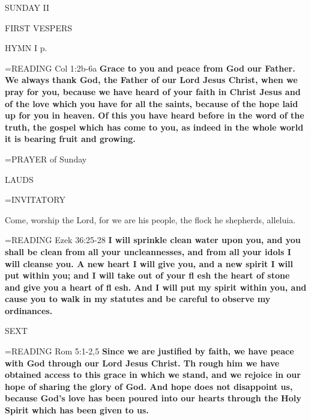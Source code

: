 \begin{center}\normalsize SUNDAY II\\
\end{center}

\begin{flushleft}\normalsize FIRST VESPERS\\\end{flushleft}

HYMN I p. \pageref{ordinaryTime:firstHymn}

\hangindent=\parindent \small{READING} Col 1:2b-6a \textbf{Grace to you and peace from God our Father.  We always thank God, the Father of our Lord Jesus Christ, when we pray for you, because we have heard of your faith in Christ Jesus and of the love which you have for all the saints, because of the hope laid up for you in heaven. Of this you have heard before in the word of the truth, the gospel which has come to you, as indeed in the whole world it is bearing fruit and growing.  \\}

\hangindent=\parindent \small{PRAYER  of Sunday}

\begin{flushleft}\normalsize LAUDS\\\end{flushleft}

\hangindent=\parindent \small{INVITATORY}
\begin{center}
\end{center}

Come, worship the Lord, for we are his people, the flock he shepherds, alleluia.

\hangindent=\parindent \small{READING} Ezek 36:25-28 \textbf{I will sprinkle clean water upon you, and you shall be clean from all your uncleannesses, and from all your idols I will cleanse you. A new heart I will give you, and a new spirit I will put within you; and I will take out of your fl esh the heart of stone and give you a heart of fl esh. And I will put my spirit within you, and cause you to walk in my statutes and be careful to observe my ordinances.\\}

\begin{flushleft}\normalsize SEXT\\\end{flushleft}

\hangindent=\parindent \small{READING} Rom 5:1-2,5 \textbf{Since we are justified by faith, we have peace with God through our Lord Jesus Christ. Th rough him we have obtained access to this grace in which we stand, and we rejoice in our hope of sharing the glory of God. And hope does not disappoint us, because God’s love has been poured into our hearts through the Holy Spirit which has been given to us.  }

